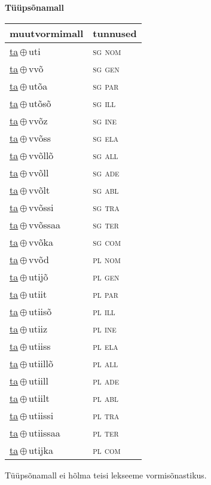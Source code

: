 

\vspace{3.5em}
\noindent \begin{minipage}{\textwidth}
\noindent \textbf{Tüüpsõnamall \,}\\

\begin{sideways}
\begin{tabular}{l l}
muutvormimall & tunnused \\
\hline
\underline{ta}\,$\oplus$\,uti & \textsc{ sg nom } \\
\underline{ta}\,$\oplus$\,vvõ & \textsc{ sg gen } \\
\underline{ta}\,$\oplus$\,utõa & \textsc{ sg par } \\
\underline{ta}\,$\oplus$\,utõsõ & \textsc{ sg ill } \\
\underline{ta}\,$\oplus$\,vvõz & \textsc{ sg ine } \\
\underline{ta}\,$\oplus$\,vvõss & \textsc{ sg ela } \\
\underline{ta}\,$\oplus$\,vvõllõ & \textsc{ sg all } \\
\underline{ta}\,$\oplus$\,vvõll & \textsc{ sg ade } \\
\underline{ta}\,$\oplus$\,vvõlt & \textsc{ sg abl } \\
\underline{ta}\,$\oplus$\,vvõssi & \textsc{ sg tra } \\
\underline{ta}\,$\oplus$\,vvõssaa & \textsc{ sg ter } \\
\underline{ta}\,$\oplus$\,vvõka & \textsc{ sg com } \\
\underline{ta}\,$\oplus$\,vvõd & \textsc{ pl nom } \\
\underline{ta}\,$\oplus$\,utijõ & \textsc{ pl gen } \\
\underline{ta}\,$\oplus$\,utiit & \textsc{ pl par } \\
\underline{ta}\,$\oplus$\,utiisõ & \textsc{ pl ill } \\
\underline{ta}\,$\oplus$\,utiiz & \textsc{ pl ine } \\
\underline{ta}\,$\oplus$\,utiiss & \textsc{ pl ela } \\
\underline{ta}\,$\oplus$\,utiillõ & \textsc{ pl all } \\
\underline{ta}\,$\oplus$\,utiill & \textsc{ pl ade } \\
\underline{ta}\,$\oplus$\,utiilt & \textsc{ pl abl } \\
\underline{ta}\,$\oplus$\,utiissi & \textsc{ pl tra } \\
\underline{ta}\,$\oplus$\,utiissaa & \textsc{ pl ter } \\
\underline{ta}\,$\oplus$\,utijka & \textsc{ pl com } \\
\end{tabular}
\end{sideways}
\label{tab:tüüpsõnamall-tauti}

\end{minipage}

 
\vspace{1em}
\noindent Tüüpsõnamall  ei hõlma teisi lekseeme vormi\-sõnastikus.
